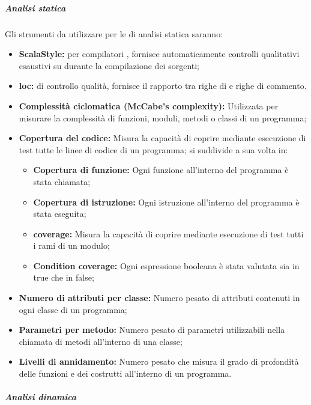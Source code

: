 \documentclass{scalatekids-article}
\begin{document}
\subparagraph{Analisi statica}
\label{sec:AnalisiStatica}

Gli strumenti da utilizzare per le  di analisi statica saranno:
\begin{itemize}
    \item\textbf{ScalaStyle:}  per compilatori , fornisce automaticamente controlli qualitativi esaustivi su  durante la compilazione dei sorgenti;
    \item\textbf{loc:}  di controllo qualità, fornisce il rapporto tra righe di  e righe di commento.
    \item\textbf{Complessità ciclomatica (McCabe's complexity):} Utilizzata per
        misurare la complessità di funzioni, moduli, metodi o classi di un
        programma;
    \item\textbf{Copertura del codice:} Misura la capacità di coprire mediante
        esecuzione di test tutte le linee di codice di un programma; si
        suddivide a sua volta in:
        \begin{itemize}
            \item\textbf{Copertura di funzione:} Ogni funzione all'interno del
                programma è stata chiamata;
            \item\textbf{Copertura di istruzione:} Ogni istruzione all'interno
                del programma è stata eseguita;
            \item\textbf{ coverage:} Misura la capacità di coprire
                mediante esecuzione di test tutti i rami di un modulo;
            \item\textbf{Condition coverage:} Ogni espressione booleana è stata
                valutata sia in true che in false;
        \end{itemize}
    \item\textbf{Numero di attributi per classe:} Numero pesato di attributi
        contenuti in ogni classe di un programma;
    \item\textbf{Parametri per metodo:} Numero pesato di parametri utilizzabili
        nella chiamata di metodi all'interno di una classe;
    \item\textbf{Livelli di annidamento:} Numero pesato che misura il grado di
        profondità delle funzioni e dei costrutti all'interno di un programma.
\end{itemize}

\subparagraph{Analisi dinamica}
\end{document}
